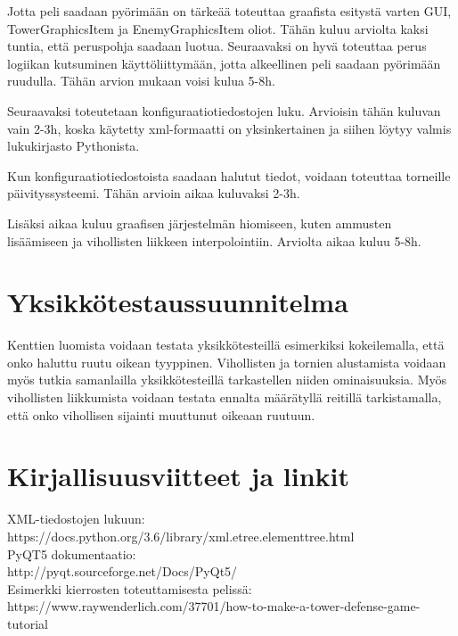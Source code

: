 \documentclass{article}
\begin{document}
Jotta peli saadaan pyörimään on tärkeää toteuttaa graafista esitystä varten GUI, TowerGraphicsItem ja EnemyGraphicsItem oliot. Tähän kuluu arviolta kaksi tuntia, että peruspohja saadaan luotua. Seuraavaksi on hyvä toteuttaa perus logiikan kutsuminen käyttöliittymään, jotta alkeellinen peli saadaan pyörimään ruudulla. Tähän arvion mukaan voisi kulua 5-8h.

Seuraavaksi toteutetaan konfiguraatiotiedostojen luku. Arvioisin tähän kuluvan vain 2-3h, koska käytetty xml-formaatti on yksinkertainen ja siihen löytyy valmis lukukirjasto Pythonista.

Kun konfiguraatiotiedostoista saadaan halutut tiedot, voidaan toteuttaa torneille päivityssysteemi. Tähän arvioin aikaa kuluvaksi 2-3h.

Lisäksi aikaa kuluu graafisen järjestelmän hiomiseen, kuten ammusten lisää\-miseen ja vihollisten liikkeen interpolointiin. Arviolta aikaa kuluu 5-8h.
\section{Yksikkötestaussuunnitelma}
Kenttien luomista voidaan testata yksikkötesteillä esimerkiksi kokeilemalla, että onko haluttu ruutu oikean tyyppinen. Vihollisten ja tornien alustamista voidaan myös tutkia samanlailla yksikkötesteillä tarkastellen niiden ominaisuuksia. Myös vihollisten liikkumista voidaan testata ennalta määrätyllä reitillä tarkistamalla, että onko vihollisen sijainti muuttunut oikeaan ruutuun.

\section{Kirjallisuusviitteet ja linkit}

XML-tiedostojen lukuun: \\
https://docs.python.org/3.6/library/xml.etree.elementtree.html \\
PyQT5 dokumentaatio: \\
http://pyqt.sourceforge.net/Docs/PyQt5/ \\
Esimerkki kierrosten toteuttamisesta pelissä: \\
https://www.raywenderlich.com/37701/how-to-make-a-tower-defense-game-tutorial
\end{document}
